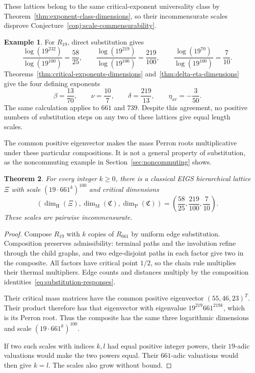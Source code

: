 \documentclass[scheme=plain,11pt]{ctexart}
\newtheorem{theorem}{Theorem}[section]
\theoremstyle{definition}
\newtheorem{example}[theorem]{Example}
\theoremstyle{remark}
\begin{document}
These lattices belong to the same critical-exponent universality class by Theorem~\ref{thm:exponent-class-dimensions}, so their incommensurate scales disprove Conjecture~\ref{conj:scale-commensurability}.

\begin{example}
For $R_{19}$, direct substitution gives
\[
 \frac{\log(19^{232})}{\log(19^{100})}=\frac{58}{25},\qquad
 \frac{\log(19^{219})}{\log(19^{100})}=\frac{219}{100},\qquad
 \frac{\log(19^{70})}{\log(19^{100})}=\frac7{10}.
\]
Theorems~\ref{thm:critical-exponents-dimensions} and~\ref{thm:delta-eta-dimensions} give the four defining exponents
\[
 \beta=\frac{13}{70},\qquad
 \nu=\frac{10}{7},\qquad
 \delta=\frac{219}{13},\qquad
 \eta_{\mathrm{av}}=-\frac3{50}.
\]
The same calculation applies to $661$ and $739$. Despite this agreement, no positive numbers of substitution steps on any two of these lattices give equal length scales.
\end{example}

The common positive eigenvector makes the mass Perron roots multiplicative under these particular compositions. It is not a general property of substitution, as the noncommuting example in Section~\ref{sec:noncommuting} shows.
\begin{theorem}\label{cor:infinite-scales}\label{thm:infinite-incommensurate-scales}
For every integer $k\ge0$, there is a classical EIGS hierarchical lattice $\Xi$ with scale $(19\cdot661^k)^{100}$ and critical dimensions
\[
 (\dim_{\mathrm H}(\Xi),\dim_{\mathrm M}(\mathfrak C),\dim_{\mathrm P}(\mathfrak C))
 =\left(\frac{58}{25},\frac{219}{100},\frac7{10}\right).
\]
These scales are pairwise incommensurate.
\end{theorem}
\begin{proof}
Compose $R_{19}$ with $k$ copies of $R_{661}$ by uniform edge substitution. Composition preserves admissibility: terminal paths and the involution refine through the child graphs, and two edge-disjoint paths in each factor give two in the composite. All factors have critical point $1/2$, so the chain rule multiplies their thermal multipliers. Edge counts and distances multiply by the composition identities~\eqref{eq:substitution-responses}.

Their critical mass matrices have the common positive eigenvector $(55,46,23)^T$. Their product therefore has that eigenvector with eigenvalue $19^{219}661^{219k}$, which is its Perron root. Thus the composite has the same three logarithmic dimensions and scale $(19\cdot661^k)^{100}$.

If two such scales with indices $k,l$ had equal positive integer powers, their $19$-adic valuations would make the two powers equal. Their $661$-adic valuations would then give $k=l$. The scales also grow without bound.
\end{proof}
\end{document}
